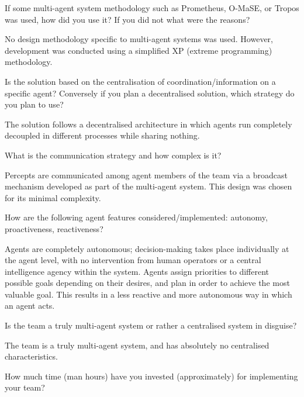\begin{question}
If some multi-agent system methodology such
as Prometheus, O-MaSE, or Tropos was used, how did you use it? If you did not
what were the reasons?  
\end{question}
No design methodology specific to multi-agent systems
was used. However, development was conducted using a simplified XP (extreme
programming) methodology. 

\begin{question}
Is the solution based on the centralisation of coordination/information on
a specific agent? Conversely if you plan a decentralised solution, which
strategy do you plan to use?  
\begin{question}

The solution follows a decentralised
architecture in which agents run completely decoupled in different processes
while sharing nothing.

\begin{question}
What is the communication strategy and how complex is it?  
\end{question}

Percepts are
communicated among agent members of the team via a broadcast mechanism
developed as part of the multi-agent system. This design was chosen for its
minimal complexity.

\begin{question}
How are the following agent features considered/implemented: autonomy,
proactiveness, reactiveness?  
\end{question}
Agents are completely autonomous;
decision-making takes place individually at the agent level, with no
intervention from human operators or a central intelligence agency within the
system.  Agents assign priorities to different possible goals depending on
their desires, and plan in order to achieve the most valuable goal. This
results in a less reactive and more autonomous way in which an agent acts.

\begin{question}
Is the team a truly multi-agent system or rather a centralised system in
disguise?  
\end{question}
The team is a truly multi-agent system, and has absolutely no
centralised characteristics.

\begin{question}
How much time (man hours) have you invested (approximately) for
implementing your team?  
\end{question}


\end{question}
\end{question}
